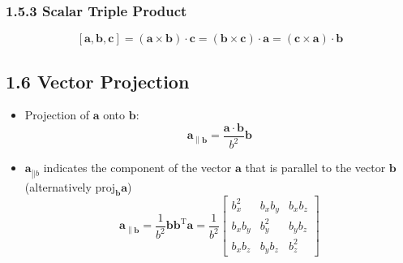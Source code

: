 \documentclass[11pt]{article}
\newcommand{\bm}[1]{\mathbf{#1}}
\begin{document}
\subsubsection*{1.5.3 Scalar Triple Product}
\begin{equation} \label{eqn:triple}
    \bm{\left[ a, b, c \right]} =
    \left(\bm{a} \times \bm{b}\right) \cdot \bm{c} =
    \left(\bm{b} \times \bm{c}\right) \cdot \bm{a} =
    \left(\bm{c} \times \bm{a}\right) \cdot \bm{b}
\end{equation}

\subsection*{1.6 Vector Projection}
\begin{itemize}
\item Projection of $\bm{a}$ onto $\bm{b}$:
    \begin{equation}
        \bm{a}_{\left\|\bm{b}\right.} =
        \frac{\bm{a} \cdot \bm{b}}{b^2} \bm{b}
    \end{equation}

\item $\bm{a}_{\left||b\right.}$ indicates the component of the vector $\bm{a}$ that is parallel to the vector $\bm{b}$ (alternatively $\text{proj}_\bm{b} \bm{a}$)
    \begin{equation}
        \bm{a}_{\left\|\bm{b}\right.} =
        \frac{1}{b^2} \bm{b}\bm{b}^\text{T} \bm{a} =
        \frac{1}{b^2}
        \begin{bmatrix}
        b_x^2 & b_x b_y & b_x b_z \\
        b_x b_y & b_y^2 & b_y b_z \\
        b_x b_z & b_y b_z & b_z^2
        \end{bmatrix}
    \end{equation}


\end{itemize}
\end{document}
